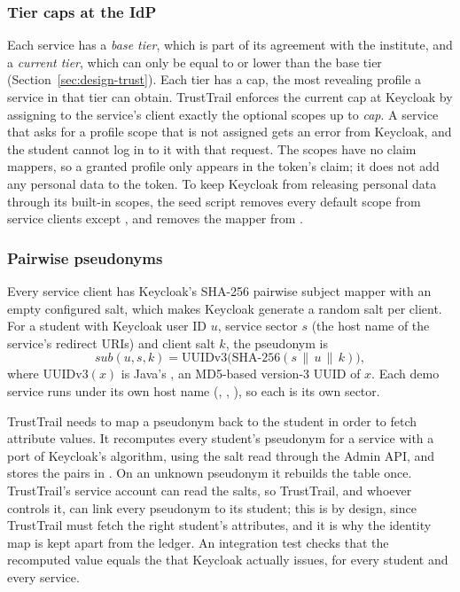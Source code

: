 \subsubsection{Tier caps at the IdP}
Each service has a \emph{base tier}, which is part of its agreement with the institute, and a \emph{current tier}, which can only be equal to or lower than the base tier (Section~\ref{sec:design-trust}). Each tier has a cap, the most revealing profile a service in that tier can obtain. TrustTrail enforces the current cap at Keycloak by assigning to the service's client exactly the optional scopes  up to \emph{cap}. A service that asks for a profile scope that is not assigned gets an  error from Keycloak, and the student cannot log in to it with that request. The scopes have no claim mappers, so a granted profile only appears in the token's  claim; it does not add any personal data to the token. To keep Keycloak from releasing personal data through its built-in scopes, the seed script removes every default scope from service clients except , and removes the  mapper from .

\subsubsection{Pairwise pseudonyms}
Every service client has Keycloak's SHA-256 pairwise subject mapper with an empty configured salt, which makes Keycloak generate a random salt per client. For a student with Keycloak user ID $u$, service sector $s$ (the host name of the service's redirect URIs) and client salt $k$, the pseudonym is
\begin{equation}
\mathit{sub}(u, s, k) = \mathrm{UUIDv3}\bigl(\mathrm{SHA\mbox{-}256}(s \,\|\, u \,\|\, k)\bigr),
\end{equation}
where $\mathrm{UUIDv3}(x)$ is Java's , an MD5-based version-3 UUID of $x$. Each demo service runs under its own host name (, , ), so each is its own sector.

TrustTrail needs to map a pseudonym back to the student in order to fetch attribute values. It recomputes every student's pseudonym for a service with a port of Keycloak's algorithm, using the salt read through the Admin API, and stores the pairs in . On an unknown pseudonym it rebuilds the table once. TrustTrail's service account can read the salts, so TrustTrail, and whoever controls it, can link every pseudonym to its student; this is by design, since TrustTrail must fetch the right student's attributes, and it is why the identity map is kept apart from the ledger. An integration test checks that the recomputed value equals the  that Keycloak actually issues, for every student and every service.

